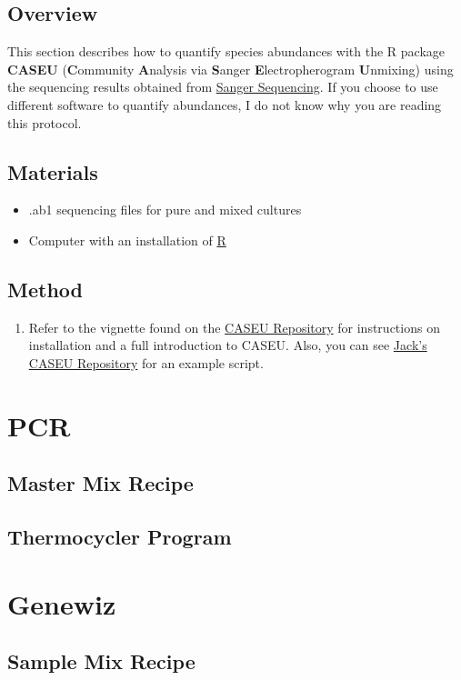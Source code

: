 \documentclass[onecolumn]{article}
\begin{document}
\subsection{Overview}
This section describes how to quantify species abundances with the R package \textbf{CASEU}
(\textbf{C}ommunity \textbf{A}nalysis via \textbf{S}anger \textbf{E}lectropherogram \textbf{U}nmixing)
\cite{Cermak_2020}
using the sequencing results obtained from \hyperref[SS]{Sanger Sequencing}.
If you choose to use different software to quantify abundances,
I do not know why you are reading this protocol.

\subsection{Materials}
\begin{itemize}
  \item .ab1 sequencing files for pure and mixed cultures
  \item Computer with an installation of \href{https://www.r-project.org}{R}
\end{itemize}

\subsection{Method}
\begin{enumerate}
  \item Refer to the vignette found on the \href{https://htmlpreview.github.io/?https://bitbucket.org/dattamanoshi/caseu/raw/master/doc/CASEU_Vignette.html}{CASEU Repository} for instructions on installation and a full introduction to CASEU. Also, you can see \href{https://github.com/jpsco5890/quantify_16S_ratios.git}{Jack's CASEU Repository} for an example script.
\end{enumerate}

\appendix
\section{PCR}\label{aA}
\subsection{Master Mix Recipe}

\subsection{Thermocycler Program}

\section{Genewiz}\label{aB}
\subsection{Sample Mix Recipe}



\end{document}
